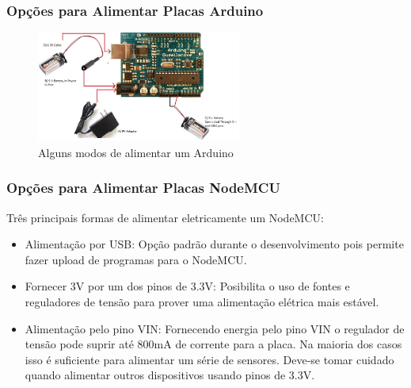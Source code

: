 \documentclass{beamer}
\begin{document}
\begin{frame}
	\frametitle{Opções para Alimentar Placas Arduino}
	\begin{minipage}{\textwidth}
		\begin{figure}[!ht]
			\centering
			\includegraphics[width=0.6\textwidth]{alimentacao_ArduinoUNO.jpg}
			\caption{Alguns modos de alimentar um Arduino}
			\label{fig:ndfgode_dfgdpower_pins}
			\vspace{-10pt}
		\end{figure}
	\end{minipage}
\end{frame} 



\begin{frame}
\frametitle{Opções para Alimentar Placas NodeMCU}
\begin{minipage}{\textwidth}
	Três principais formas de alimentar eletricamente um NodeMCU:
	
	\begin{itemize}
		\item
		Alimentação por USB: Opção padrão durante o desenvolvimento pois permite fazer upload de programas para o NodeMCU. 
		\item 
		Fornecer 3V por um dos pinos de 3.3V: Posibilita o uso de fontes e reguladores de tensão para prover uma alimentação elétrica mais estável.
		\item
		Alimentação pelo pino VIN: Fornecendo energia pelo pino VIN o regulador de tensão pode suprir até 800mA de corrente para a placa. Na maioria dos casos isso é suficiente para alimentar um série de sensores. Deve-se tomar cuidado quando alimentar outros dispositivos usando pinos de 3.3V.
		
	\end{itemize}
\end{minipage}
\end{frame} 
\end{document}
